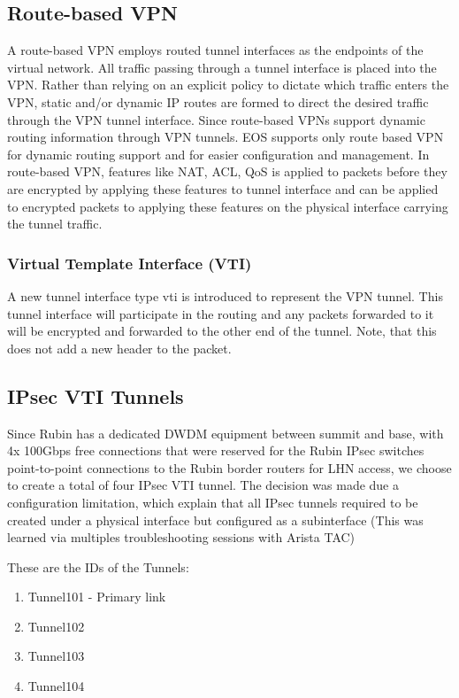 \subsection{Route-based VPN}
A route-based VPN employs routed tunnel interfaces as the endpoints of the virtual network. All traffic passing through a tunnel interface is placed into the VPN. Rather than relying on an explicit policy to dictate which traffic enters the VPN, static and/or dynamic IP routes are formed to direct the desired traffic through the VPN tunnel interface.
Since route-based VPNs support dynamic routing information through VPN tunnels. EOS supports only route based VPN for dynamic routing support and for easier configuration and management.
In route-based VPN, features like NAT, ACL, QoS is applied to packets before they are encrypted by applying these features to tunnel interface and can be applied to encrypted packets to applying these features on the physical interface carrying the tunnel traffic.
  
\subsubsection{Virtual Template Interface (VTI)}
A new tunnel interface type vti is introduced to represent the VPN tunnel. This tunnel interface will participate in the routing and any packets forwarded to it will be encrypted and forwarded to the other end of the tunnel. Note, that this does not add a new header to the packet.

\subsection{IPsec VTI Tunnels}

Since Rubin has a dedicated DWDM equipment between summit and base, with 4x 100Gbps free connections that were reserved for the Rubin IPsec switches point-to-point connections to the Rubin border routers for LHN access, we choose to create a total of four IPsec VTI tunnel. The decision was made due a configuration limitation, which explain that all IPsec tunnels required to be created under a physical interface but configured as a subinterface (This was learned via multiples troubleshooting sessions with Arista TAC)

These are the IDs of the Tunnels:
    \begin{enumerate}
        \item Tunnel101 - Primary link
        \item Tunnel102
        \item Tunnel103
        \item Tunnel104
    \end{enumerate}

